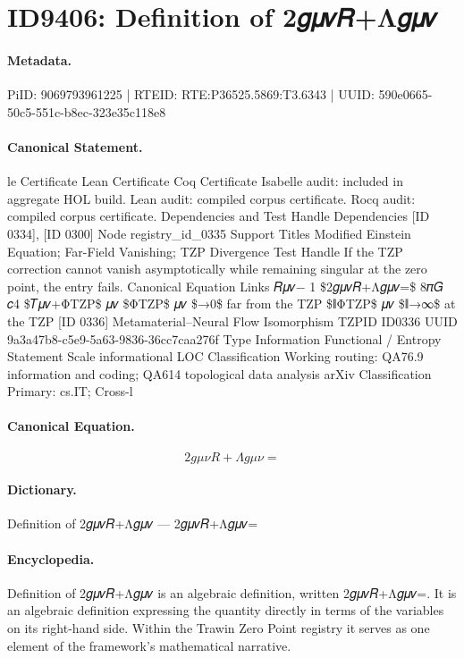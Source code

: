 \section*{ID9406: Definition of 2𝑔𝜇𝜈𝑅+Λ𝑔𝜇𝜈}
\paragraph{Metadata.}
PiID: 9069793961225 | RTEID: RTE:P36525.5869:T3.6343 | UUID: 590e0665-50c5-551c-b8ec-323e35c118e8

\paragraph{Canonical Statement.}
le Certificate Lean Certificate Coq Certificate Isabelle audit: included in aggregate HOL build. Lean audit: compiled corpus certificate. Rocq audit: compiled corpus certificate. Dependencies and Test Handle Dependencies [ID 0334], [ID 0300] Node registry\_id\_0335 Support Titles Modified Einstein Equation; Far-Field Vanishing; TZP Divergence Test Handle If the TZP correction cannot vanish asymptotically while remaining singular at the zero point, the entry fails. Canonical Equation Links 𝑅𝜇𝜈− 1 \$2𝑔𝜇𝜈𝑅+Λ𝑔𝜇𝜈=\$ 8𝜋𝐺 𝑐4 \$𝑇𝜇𝜈+ΦTZP\$ 𝜇𝜈 \$ΦTZP\$ 𝜇𝜈 \$→0\$ far from the TZP \$∥ΦTZP\$ 𝜇𝜈 \$∥→∞\$ at the TZP [ID 0336] Metamaterial–Neural Flow Isomorphism TZPID ID0336 UUID 9a3a47b8-c5e9-5a63-9836-36cc7caa276f Type Information Functional / Entropy Statement Scale informational LOC Classification Working routing: QA76.9 information and coding; QA614 topological data analysis arXiv Classification Primary: cs.IT; Cross-l

\paragraph{Canonical Equation.}
\[
2𝑔𝜇𝜈𝑅+Λ𝑔𝜇𝜈=
\]

\paragraph{Dictionary.}
Definition of 2𝑔𝜇𝜈𝑅+Λ𝑔𝜇𝜈 — 2𝑔𝜇𝜈𝑅+Λ𝑔𝜇𝜈=

\paragraph{Encyclopedia.}
Definition of 2𝑔𝜇𝜈𝑅+Λ𝑔𝜇𝜈 is an algebraic definition, written 2𝑔𝜇𝜈𝑅+Λ𝑔𝜇𝜈=. It is an algebraic definition expressing the quantity directly in terms of the variables on its right-hand side. Within the Trawin Zero Point registry it serves as one element of the framework's mathematical narrative.
